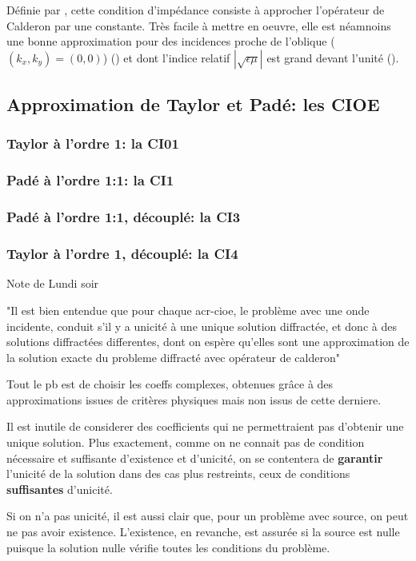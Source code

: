 \documentclass[12pt,%
    twoside,%
    a4paper,%
    openright, %
    ]{book}
\numberwithin{equation}{section} %
\newcommand{\eps}{\epsilon}
\newcounter{REM}
\newenvironment{REM}[1][\theREM]
    {%
        \stepcounter{REM}
        \hypertarget{REM#1}{}%
        \pdfbookmark[0]{REM \theREM}{REM#1}
        \begin{tcolorbox}[%
                title={Remarque \theREM},%
                colback=red!30!white,%
                colframe=red!75!black,%
            ]
    }
    {
        \end{tcolorbox}%
    }%
\begin{document}
        Définie par \cite{leontovich_investigations_1948}, cette condition d'impédance consiste à approcher l'opérateur de Calderon par une constante.
        Très facile à mettre en oeuvre, elle est néamnoins une bonne approximation pour des incidences proche de l'oblique (\((k_x,k_y)=(0,0)\)) (\cite{leontovich_investigations_1948}) et dont l'indice relatif \(|\sqrt{\eps\mu}|\) est grand devant l'unité (\cite[par.~3, p.421-422]{senior_impedance_1960}).

    \subsection{Approximation de Taylor et Padé: les CIOE}

        \subsubsection{Taylor à l'ordre 1: la CI01}

        \subsubsection{Padé à l'ordre 1:1: la CI1}

        \subsubsection{Padé à l'ordre 1:1, découplé: la CI3}

        \subsubsection{Taylor à l'ordre 1, découplé: la CI4}

        \begin{REM}
            Note de Lundi soir

            "Il est bien entendue que pour chaque \gls{acr-cioe}, le problème avec une onde incidente, conduit s'il y a unicité à une unique solution diffractée, et donc à des solutions diffractées differentes, dont on espère qu'elles sont une approximation de la solution exacte du probleme diffracté avec opérateur de calderon"

            Tout le pb est de choisir les coeffs complexes, obtenues grâce à des approximations issues de critères physiques mais non issus de cette derniere. 

            Il est inutile de considerer des coefficients qui ne permettraient pas d'obtenir une unique solution.
            Plus exactement, comme on ne connait pas de condition nécessaire et suffisante d'existence et d'unicité, on se contentera de {\bf garantir} l'unicité de la solution dans des cas plus restreints, ceux de conditions {\bf suffisantes} d'unicité. 
            
            Si on n'a pas unicité, il est aussi clair que, pour un problème avec source, on peut ne pas avoir existence.
            L'existence, en revanche, est assurée si la source est nulle puisque la solution nulle vérifie toutes les conditions du problème.
        \end{REM}
\end{document}
